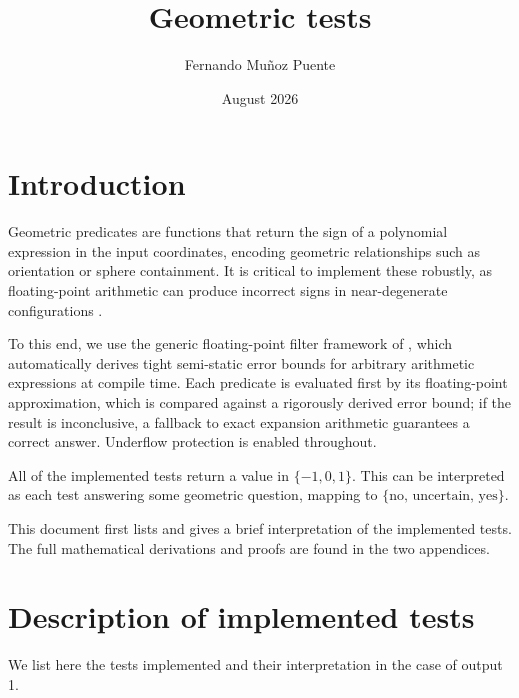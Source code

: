 \documentclass[12pt]{article}
\theoremstyle{definition}
\theoremstyle{remark}
\begin{document}
\title{\vspace{-40pt}Geometric tests}
\author{Fernando Muñoz Puente}

\date{August 2026}
\maketitle

\tableofcontents


\section*{Introduction}
Geometric predicates are functions that return the sign of a polynomial expression in the input coordinates, encoding geometric relationships such as orientation or sphere containment. It is critical to implement these 
robustly, as floating-point arithmetic can produce incorrect signs in near-degenerate configurations \cite{shewchuk1997adaptive}. 

To this end, we use the generic floating-point filter framework of \cite{bartels2023fast}, which automatically derives tight semi-static error bounds for arbitrary arithmetic expressions at compile time. Each predicate 
is evaluated first by its floating-point approximation, which is compared against a rigorously derived error bound; if the result is inconclusive, a fallback to exact expansion arithmetic \cite{shewchuk1997adaptive} guarantees a correct answer. Underflow protection is enabled throughout. 


All of the implemented tests return a value in $\{-1, 0, 1\}$. This can be interpreted as each test answering some geometric question, mapping to $\{ \text{no, uncertain, yes}\}$.

\bigskip
This document first lists and gives a brief interpretation of the implemented tests. The full mathematical derivations and proofs are found in the two appendices.

\newpage


\section{Description of implemented tests}
 We list here the tests implemented and their interpretation in the case of output 1.
\end{document}
